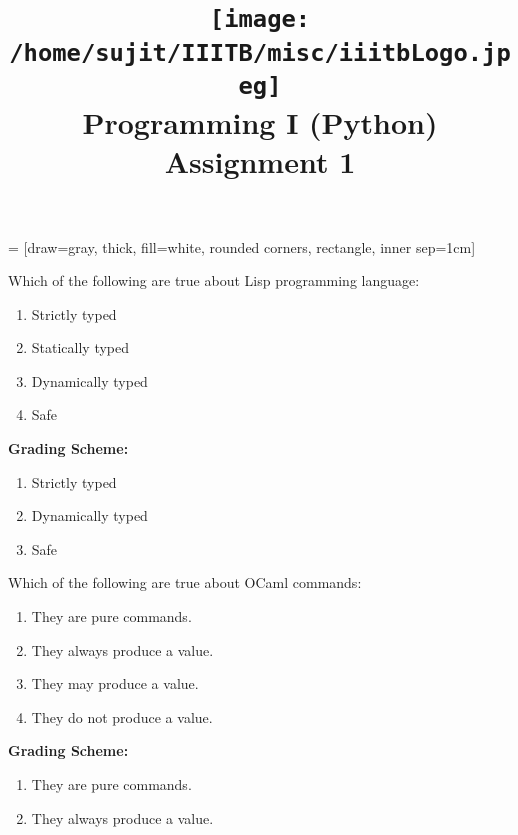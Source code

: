 \documentclass[addpoints,11pt]{exam}
\author{}
\title{\texttt{[image: /home/sujit/IIITB/misc/iiitbLogo.jpeg]} \\ Programming I (Python) \\ Assignment 1}
\date{}
\newcommand{\grade}[1]{{\color{red}\textbf{Grading Scheme:} #1}}
\begin{document}
   = [draw=gray, thick, fill=white, rounded corners, rectangle, inner sep=1cm]
\maketitle


\thispagestyle{head}

\begin{questions}

\question Which of the following are true about Lisp programming language:
\begin{enumerate}
\item Strictly typed
\item Statically typed
\item Dynamically typed
\item Safe
\end{enumerate}
\begin{solution}
\grade{
\begin{enumerate}
\item Strictly typed
\item Dynamically typed
\item Safe
\end{enumerate}
}
\end{solution}

\question Which of the following are true about OCaml commands:
\begin{enumerate}
\item They are pure commands.
\item They always produce a value.
\item They may produce a value.
\item They do not produce a value.
\end{enumerate}
\begin{solution}
\grade{
\begin{enumerate}
\item They are pure commands.
\item They always produce a value.
\end{enumerate}
}
\end{solution}


\end{questions}
\end{document}
